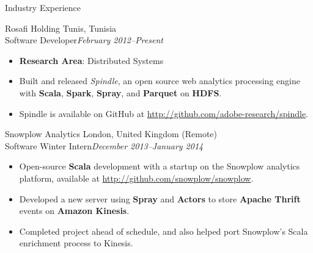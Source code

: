 \documentclass[letter]{article}
\begin{document}
\begin{minipage}{\textwidth}
{\huge Industry Experience }


  
    {\large Rosafi Holding } \hfill Tunis, Tunisia \\
    Software Developer\hfill {\it February 2012--Present}\begin{itemize}
      
        \item {\bf Research Area}: Distributed Systems
      
        \item Built and released {\it Spindle}, an open source web analytics processing engine with {\bf Scala}, {\bf Spark}, {\bf Spray}, and {\bf Parquet} on {\bf HDFS}.
      
        \item Spindle is available on GitHub at \url{http://github.com/adobe-research/spindle}.
      
      \end{itemize}\end{minipage}
    \begin{minipage}{\textwidth}
    \bigskip
  
    {\large Snowplow Analytics } \hfill London, United Kingdom (Remote) \\
    Software Winter Intern\hfill {\it December 2013--January 2014}\begin{itemize}
      
        \item Open-source {\bf Scala} development with a startup on the Snowplow analytics platform, available at \url{http://github.com/snowplow/snowplow}.
      
        \item Developed a new server using {\bf Spray} and {\bf Actors} to store {\bf Apache Thrift} events on {\bf Amazon Kinesis}.
      
        \item Completed project ahead of schedule, and also helped port Snowplow's Scala enrichment process to Kinesis.
      
      \end{itemize}\end{minipage}
\end{document}
